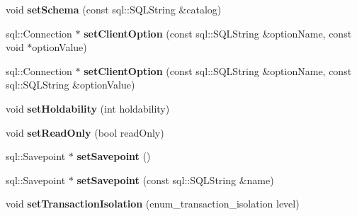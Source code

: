 \begin{DoxyCompactItemize}
\item 
void {\bfseries set\+Schema} (const sql\+::\+S\+Q\+L\+String \&catalog)\hypertarget{classsql_1_1mysql_1_1MySQL__Connection_ae9c04f366688e047e898487bc6fd6e1b}{}\label{classsql_1_1mysql_1_1MySQL__Connection_ae9c04f366688e047e898487bc6fd6e1b}

\item 
sql\+::\+Connection $\ast$ {\bfseries set\+Client\+Option} (const sql\+::\+S\+Q\+L\+String \&option\+Name, const void $\ast$option\+Value)\hypertarget{classsql_1_1mysql_1_1MySQL__Connection_a146973ddeaf89e344b719cefb09c55ad}{}\label{classsql_1_1mysql_1_1MySQL__Connection_a146973ddeaf89e344b719cefb09c55ad}

\item 
sql\+::\+Connection $\ast$ {\bfseries set\+Client\+Option} (const sql\+::\+S\+Q\+L\+String \&option\+Name, const sql\+::\+S\+Q\+L\+String \&option\+Value)\hypertarget{classsql_1_1mysql_1_1MySQL__Connection_a2e01fff22d660d797501ac29e9a436e7}{}\label{classsql_1_1mysql_1_1MySQL__Connection_a2e01fff22d660d797501ac29e9a436e7}

\item 
void {\bfseries set\+Holdability} (int holdability)\hypertarget{classsql_1_1mysql_1_1MySQL__Connection_a4703a47ce23ba73ec2fadfc680b2e868}{}\label{classsql_1_1mysql_1_1MySQL__Connection_a4703a47ce23ba73ec2fadfc680b2e868}

\item 
void {\bfseries set\+Read\+Only} (bool read\+Only)\hypertarget{classsql_1_1mysql_1_1MySQL__Connection_ac4bafbedfb801fa73694ddbfca4a95c6}{}\label{classsql_1_1mysql_1_1MySQL__Connection_ac4bafbedfb801fa73694ddbfca4a95c6}

\item 
sql\+::\+Savepoint $\ast$ {\bfseries set\+Savepoint} ()\hypertarget{classsql_1_1mysql_1_1MySQL__Connection_afca8998459c9f06788b3ed3be25b81de}{}\label{classsql_1_1mysql_1_1MySQL__Connection_afca8998459c9f06788b3ed3be25b81de}

\item 
sql\+::\+Savepoint $\ast$ {\bfseries set\+Savepoint} (const sql\+::\+S\+Q\+L\+String \&name)\hypertarget{classsql_1_1mysql_1_1MySQL__Connection_a2d0045db252b83fd0222e716f9bfc71d}{}\label{classsql_1_1mysql_1_1MySQL__Connection_a2d0045db252b83fd0222e716f9bfc71d}

\item 
void {\bfseries set\+Transaction\+Isolation} (enum\+\_\+transaction\+\_\+isolation level)\hypertarget{classsql_1_1mysql_1_1MySQL__Connection_a50c5f85205c2333804ee503778ed05b0}{}\label{classsql_1_1mysql_1_1MySQL__Connection_a50c5f85205c2333804ee503778ed05b0}


\end{DoxyCompactItemize}

